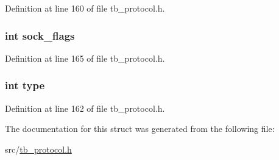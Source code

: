 Definition at line 160 of file tb\-\_\-protocol.\-h.

\hypertarget{structtb__protocol__t_addb542b46765ba0bbea2dfce904440ab}{
\subsubsection[{sock\-\_\-flags}]{\setlength{\rightskip}{0pt plus 5cm}int sock\-\_\-flags}}\label{structtb__protocol__t_addb542b46765ba0bbea2dfce904440ab}


Definition at line 165 of file tb\-\_\-protocol.\-h.

\hypertarget{structtb__protocol__t_ac765329451135abec74c45e1897abf26}{
\subsubsection[{type}]{\setlength{\rightskip}{0pt plus 5cm}int type}}\label{structtb__protocol__t_ac765329451135abec74c45e1897abf26}


Definition at line 162 of file tb\-\_\-protocol.\-h.



The documentation for this struct was generated from the following file\-:\begin{DoxyCompactItemize}
\item 
src/\hyperlink{tb__protocol_8h}{tb\-\_\-protocol.\-h}\end{DoxyCompactItemize}

